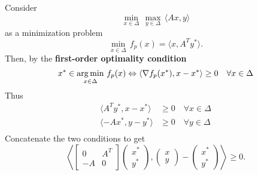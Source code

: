 \documentclass[aspectratio=149]{beamer}
\begin{document}
\begin{frame}
  \frametitle{}
  Consider
  \begin{equation}
      \min_{x \in \Delta}\,  \max_{y \in \Delta} \, \langle Ax, y \rangle
  \end{equation}
  as a minimization problem
  \begin{equation}
      \min_{x \in \Delta}\,   f_p(x) = \langle x, A^T y^* \rangle .
  \end{equation}
  Then, by the \textbf{first-order optimality condition}
  \begin{equation}
    x^* \in \operatorname*{arg\,min}_{x \in \Delta}\,  f_p(x)  \Leftrightarrow \langle \nabla f_p(x^*), x-x^* \rangle \ge 0 \quad \forall x \in \Delta
  \end{equation}
  Thus
  \begin{equation}
    \begin{aligned}
      \langle A^T y^*, x-x^* \rangle &\ge 0 \quad \forall  x \in \Delta \\
      \langle -A x^*, y-y^* \rangle &\ge 0 \quad \forall  y \in \Delta \\
    \end{aligned}
  \end{equation}
  Concatenate the two conditions to get
  \begin{equation}
  \left\langle \begin{bmatrix}
      0 & A^T \\
      -A & 0
    \end{bmatrix}
    \left(\begin{array}{c}
      x^*\\ y^*
    \end{array}  \right),
    \left(\begin{array}{c}
      x \\ y
    \end{array}  \right)
    - %
    \left(\begin{array}{c}
      x^* \\
      y^*
    \end{array} \right)
 \right\rangle \ge 0. %
  \end{equation}
\end{frame}
\end{document}
